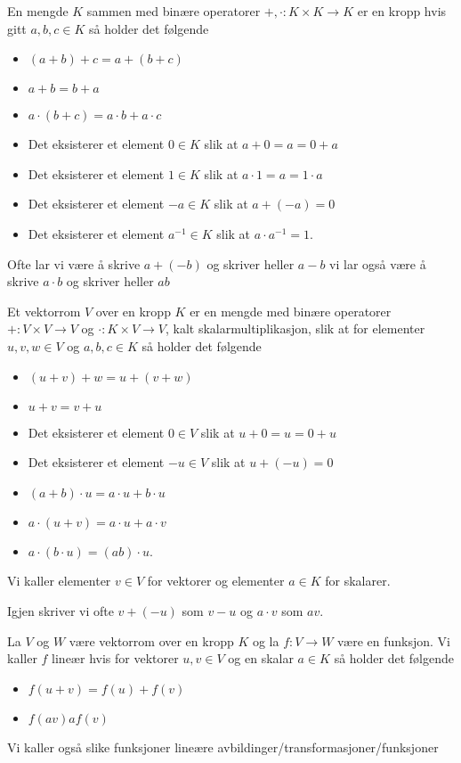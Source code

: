 \begin{definition}\label{Def:Kropp}
   En mengde $K$ sammen med binære operatorer $+,\cdot: K\times K\to K$ er en kropp hvis gitt $a,b,c\in K$ så holder det følgende
   \begin{itemize}
    \item $(a+b)+c = a+(b+c)$
    \item $a+b = b+a$
    \item $a\cdot(b+c)=a\cdot b + a\cdot c$
    \item Det eksisterer et element $0\in K$ slik at $a+0=a=0+a$
    \item Det eksisterer et element $1\in K$ slik at $a\cdot 1 = a = 1\cdot a$
    \item Det eksisterer et element $-a\in K$ slik at $a+ (-a) = 0$
    \item Det eksisterer et element $a^{-1}\in K$ slik at $a\cdot a^{-1}=1$.
   \end{itemize} 
\end{definition}
Ofte lar vi være å skrive $a+(-b)$ og skriver heller $a-b$ vi lar også være å skrive $a\cdot b$ og skriver heller $ab$

\begin{definition}\label{Def:Vektrom}
    Et vektorrom $V$ over en kropp $K$ er en mengde med binære operatorer $+:V\times V\to V$ og $\cdot: K\times V\to V$, kalt skalarmultiplikasjon, slik at for elementer $u,v,w\in V$ og $a,b,c\in K$ så holder det følgende
    \begin{itemize}
    \item $(u+v)+w = u+(v+w)$
    \item $u+v=v+u$
    \item Det eksisterer et element $0\in V$ slik at $u+0=u=0+u$
    \item Det eksisterer et element $-u\in V$ slik at $u+(-u)=0$
    \item $(a+b)\cdot u = a\cdot u + b\cdot u$
    \item $a\cdot(u+v) = a\cdot u + a\cdot v$
    \item $a\cdot (b\cdot u) = (ab)\cdot u$.
    \end{itemize}
    Vi kaller elementer $v\in V$ for vektorer og elementer $a\in K$ for skalarer.
\end{definition}
Igjen skriver vi ofte $v+(-u)$ som $v-u$ og $a\cdot v$ som $av$.

\begin{definition}\label{Def:LinAvb}
    La $V$ og $W$ være vektorrom over en kropp $K$ og la $f: V\to W$ være en funksjon. Vi kaller $f$ lineær hvis for vektorer $u,v\in V$ og en skalar $a\in K$ så holder det følgende
    \begin{itemize}
    \item $f(u+v) = f(u)+f(v)$
    \item $f(av) af(v)$
    \end{itemize}
    Vi kaller også slike funksjoner lineære avbildinger/transformasjoner/funksjoner
\end{definition}

